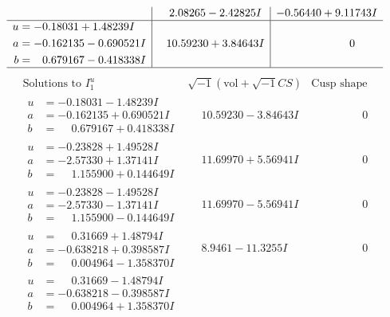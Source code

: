 \documentclass[1p]{elsarticle_modified}
\theoremstyle{definition}
\newcommand{\I}{\sqrt{-1}}
\begin{document}
$$\begin{array}{c|c|c}
 & \phantom{-}2.08265 - 2.42825 I & -0.56440 + 9.11743 I \\ \hline\begin{aligned}
u &= -0.18031 + 1.48239 I \\
a &= -0.162135 - 0.690521 I \\
b &= \phantom{-}0.679167 - 0.418338 I\end{aligned}
 & \phantom{-}10.59230 + 3.84643 I & \phantom{-0.000000 } 0\\
 \hline 
 \end{array}$$\newpage$$\begin{array}{c|c|c}  
\text{Solutions to }I^u_{1}& \I (\text{vol} + \sqrt{-1}CS) & \text{Cusp shape}\\
 \hline 
\begin{aligned}
u &= -0.18031 - 1.48239 I \\
a &= -0.162135 + 0.690521 I \\
b &= \phantom{-}0.679167 + 0.418338 I\end{aligned}
 & \phantom{-}10.59230 - 3.84643 I & \phantom{-0.000000 } 0 \\ \hline\begin{aligned}
u &= -0.23828 + 1.49528 I \\
a &= -2.57330 + 1.37141 I \\
b &= \phantom{-}1.155900 + 0.144649 I\end{aligned}
 & \phantom{-}11.69970 + 5.56941 I & \phantom{-0.000000 } 0 \\ \hline\begin{aligned}
u &= -0.23828 - 1.49528 I \\
a &= -2.57330 - 1.37141 I \\
b &= \phantom{-}1.155900 - 0.144649 I\end{aligned}
 & \phantom{-}11.69970 - 5.56941 I & \phantom{-0.000000 } 0 \\ \hline\begin{aligned}
u &= \phantom{-}0.31669 + 1.48794 I \\
a &= -0.638218 + 0.398587 I \\
b &= \phantom{-}0.004964 - 1.358370 I\end{aligned}
 & \phantom{-}8.9461 - 11.3255 I & \phantom{-0.000000 } 0 \\ \hline\begin{aligned}
u &= \phantom{-}0.31669 - 1.48794 I \\
a &= -0.638218 - 0.398587 I \\
b &= \phantom{-}0.004964 + 1.358370 I\end{aligned}

\end{array}$$
\end{document}
